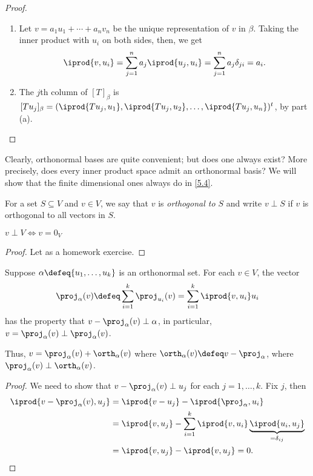\begin{proof}
    \begin{enumerate}[label=(\alph*)]
        \item Let $v = a_1 u_1 + \cdots + a_n v_n$ be the unique representation of $v$ in $\beta$. Taking the inner product with $u_i$ on both sides, then, we get \[
            \iprod{v, u_i} = \sum_{j=1}^n a_j \iprod{u_j, u_i} = \sum_{j=1}^n a_j \delta_{ji} = a_i.
        \]
        \item The $j$th column of $[T]_\beta$ is $[Tu_j]_\beta = (\iprod{Tu_j, u_1}, \iprod{Tu_j, u_2}, \dots, \iprod{Tu_j, u_n})^t$, by part (a).
    \end{enumerate}
\end{proof}


Clearly, orthonormal bases are quite convenient; but does one always exist? More precisely, does every inner product space admit an orthonormal basis? We will show that the finite dimensional ones always do in \cref{5.4}.

\begin{definition}
    For a set $S \subseteq V$ and $v \in V$, we say that $v$ is \emph{orthogonal to $S$} and write $v \perp S$ if $v$ is orthogonal to all vectors in $S$.
\end{definition}

\begin{proposition}
    $v \perp V \iff v = 0_V$
\end{proposition}

\begin{proof}
    Let as a homework exercise.
\end{proof}

\begin{lemma}\label{lemma:orthonormalsetproj}
    Suppose $\alpha \defeq \{u_1, \dots, u_k\}$ is an orthonormal set. For each $v \in V$, the vector $$\proj_\alpha(v) \defeq \sum_{i=1}^k \proj_{u_i}(v) = \sum_{i=1}^k \iprod{v, u_i} u_i$$ has the property that $v -\proj_\alpha(v) \perp \alpha$, in particular, $v = \proj_\alpha(v) \perp \proj_\alpha(v)$.

    Thus, $v = \proj_\alpha(v) + \orth_\alpha(v)$ where $\orth_\alpha(v) \defeq v - \proj_\alpha$, where $\proj_\alpha(v) \perp \orth_\alpha(v)$.
\end{lemma}

\begin{proof}
    We need to show that $v - \proj_\alpha(v) \perp u_j$ for each $j = 1, \dots, k$. Fix $j$, then \begin{align*}
        \iprod{v - \proj_\alpha(v), u_j} &= \iprod{v -u_j} - \iprod{\proj_\alpha, u_i}\\
        &= \iprod{v, u_j} - \sum_{i=1}^k\iprod{v, u_i} \underbrace{\iprod{u_i, u_j}}_{=\delta_{ij}} \\
        &= \iprod{v, u_j} - \iprod{v, u_j} = 0.
    \end{align*}
\end{proof}

